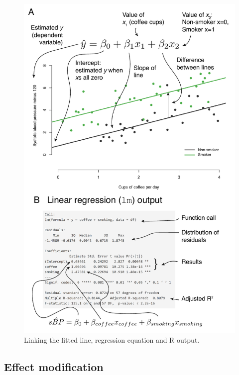\documentclass[
  12pt,
  krantz2]{krantz}
\begin{document}
\begin{figure}
\centering
\includegraphics{images/chapter07/4_equation.pdf}
\caption{\label{fig:chap07-fig-equation}Linking the fitted line, regression equation and R output.}
\end{figure}

\hypertarget{effect-modification}{%
\subsection{Effect modification}\label{effect-modification}}

\end{document}
